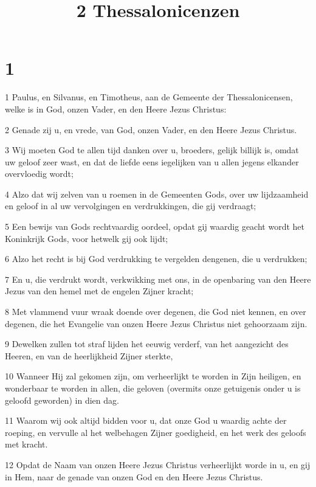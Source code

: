 

\title{2 Thessalonicenzen}



\chapter{1}

\par 1 Paulus, en Silvanus, en Timotheus, aan de Gemeente der Thessalonicensen, welke is in God, onzen Vader, en den Heere Jezus Christus:
\par 2 Genade zij u, en vrede, van God, onzen Vader, en den Heere Jezus Christus.
\par 3 Wij moeten God te allen tijd danken over u, broeders, gelijk billijk is, omdat uw geloof zeer wast, en dat de liefde eens iegelijken van u allen jegens elkander overvloedig wordt;
\par 4 Alzo dat wij zelven van u roemen in de Gemeenten Gods, over uw lijdzaamheid en geloof in al uw vervolgingen en verdrukkingen, die gij verdraagt;
\par 5 Een bewijs van Gods rechtvaardig oordeel, opdat gij waardig geacht wordt het Koninkrijk Gods, voor hetwelk gij ook lijdt;
\par 6 Alzo het recht is bij God verdrukking te vergelden dengenen, die u verdrukken;
\par 7 En u, die verdrukt wordt, verkwikking met ons, in de openbaring van den Heere Jezus van den hemel met de engelen Zijner kracht;
\par 8 Met vlammend vuur wraak doende over degenen, die God niet kennen, en over degenen, die het Evangelie van onzen Heere Jezus Christus niet gehoorzaam zijn.
\par 9 Dewelken zullen tot straf lijden het eeuwig verderf, van het aangezicht des Heeren, en van de heerlijkheid Zijner sterkte,
\par 10 Wanneer Hij zal gekomen zijn, om verheerlijkt te worden in Zijn heiligen, en wonderbaar te worden in allen, die geloven (overmits onze getuigenis onder u is geloofd geworden) in dien dag.
\par 11 Waarom wij ook altijd bidden voor u, dat onze God u waardig achte der roeping, en vervulle al het welbehagen Zijner goedigheid, en het werk des geloofs met kracht.
\par 12 Opdat de Naam van onzen Heere Jezus Christus verheerlijkt worde in u, en gij in Hem, naar de genade van onzen God en den Heere Jezus Christus.

